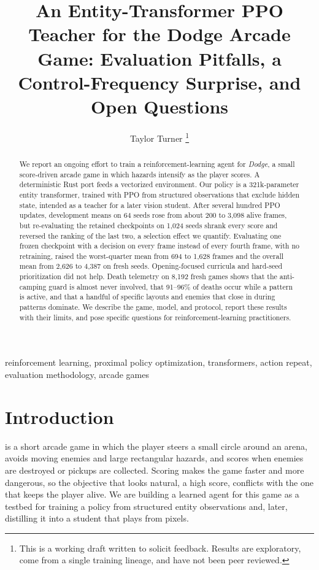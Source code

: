 \documentclass[journal]{IEEEtran}
\begin{document}
\title{An Entity-Transformer PPO Teacher for the Dodge Arcade Game: Evaluation Pitfalls, a Control-Frequency Surprise, and Open Questions}

\author{Taylor Turner%
\thanks{This is a working draft written to solicit feedback. Results are exploratory, come from a single training lineage, and have not been peer reviewed.}}


\maketitle

\begin{abstract}
We report an ongoing effort to train a reinforcement-learning agent for \emph{Dodge}, a small score-driven arcade game in which hazards intensify as the player scores. A deterministic Rust port feeds a vectorized environment. Our policy is a 321k-parameter entity transformer, trained with PPO from structured observations that exclude hidden state, intended as a teacher for a later vision student. After several hundred PPO updates, development means on 64 seeds rose from about 200 to 3{,}098 alive frames, but re-evaluating the retained checkpoints on 1{,}024 seeds shrank every score and reversed the ranking of the last two, a selection effect we quantify. Evaluating one frozen checkpoint with a decision on every frame instead of every fourth frame, with no retraining, raised the worst-quarter mean from 694 to 1{,}628 frames and the overall mean from 2{,}626 to 4{,}387 on fresh seeds. Opening-focused curricula and hard-seed prioritization did not help. Death telemetry on 8{,}192 fresh games shows that the anti-camping guard is almost never involved, that 91--96\% of deaths occur while a pattern is active, and that a handful of specific layouts and enemies that close in during patterns dominate. We describe the game, model, and protocol, report these results with their limits, and pose specific questions for reinforcement-learning practitioners.
\end{abstract}

\begin{IEEEkeywords}
reinforcement learning, proximal policy optimization, transformers, action repeat, evaluation methodology, arcade games
\end{IEEEkeywords}

\section{Introduction}
 is a short arcade game in which the player steers a small circle around an arena, avoids moving enemies and large rectangular hazards, and scores when enemies are destroyed or pickups are collected. Scoring makes the game faster and more dangerous, so the objective that looks natural, a high score, conflicts with the one that keeps the player alive. We are building a learned agent for this game as a testbed for training a policy from structured entity observations and, later, distilling it into a student that plays from pixels.
\end{document}

